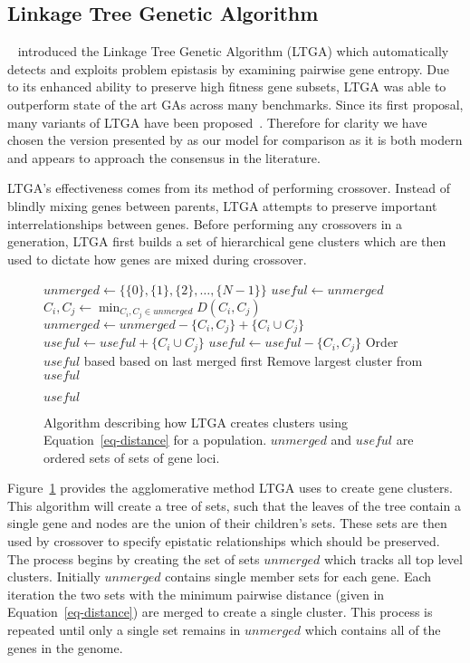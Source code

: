 \documentclass[twoside]{article}
\begin{document}
\subsection{Linkage Tree Genetic Algorithm}
~\cite{thierens:2010:ltga} introduced the Linkage Tree Genetic Algorithm (LTGA) which automatically
detects and exploits problem epistasis by examining pairwise gene entropy. Due to its enhanced
ability to preserve high fitness gene subsets, LTGA was able to outperform state of the art
GAs across many benchmarks. Since its first proposal, many variants of LTGA have been
proposed~\citep{goldman:2012:ltga}. Therefore for clarity we have chosen the version
presented by \cite{thierens:2013:ltgahiff} as our model for comparison as it is both
modern and appears to approach the consensus in the literature.

LTGA's effectiveness comes from its method of performing crossover. Instead of blindly
mixing genes between parents, LTGA attempts to preserve important interrelationships
between genes. Before performing any crossovers in a generation, LTGA first builds
a set of hierarchical gene clusters which are then used to dictate how genes are mixed
during crossover.

\begin{figure}
  \begin{algorithmic}[1]
    \State $unmerged \leftarrow \{\{0\}, \{1\}, \{2\}, \dots, \{N-1\}\}$
    \State $useful \leftarrow unmerged$
      \State $C_i, C_j \leftarrow \min_{C_i,C_j \in unmerged} D(C_i, C_j)$
      \State $unmerged \leftarrow unmerged - \{C_i, C_j\} + \{C_i \cup C_j\}$
      \State $useful \leftarrow useful + \{C_i \cup C_j\}$
        \State $useful \leftarrow useful - \{C_i, C_j\}$
      \EndIf
    \EndWhile
    \State Order $useful$ based based on last merged first\label{fig-cluster-creation-ordering}
    \State Remove largest cluster from $useful$

    \Return $useful$
  \EndProcedure
\end{algorithmic}
  \caption{Algorithm describing how LTGA creates clusters using Equation~\ref{eq-distance}
           for a population. $unmerged$ and $useful$ are ordered sets of sets of gene loci.}
  \label{fig-cluster-creation}
\end{figure}

Figure~\ref{fig-cluster-creation} provides the agglomerative method LTGA uses to create gene clusters.
This algorithm will create a tree of sets, such that the leaves of the tree contain a single gene and
nodes are the union of their children's sets. These sets are then used by crossover to specify epistatic
relationships which should be preserved.
The process begins by creating the set of sets $unmerged$ which tracks all top level clusters. Initially
$unmerged$ contains single member sets for each gene. Each iteration the two sets with the minimum pairwise
distance (given in Equation~\ref{eq-distance}) are merged to create a single cluster. This process is repeated
until only a single set remains in $unmerged$ which contains all of the genes in the genome.
\end{document}
